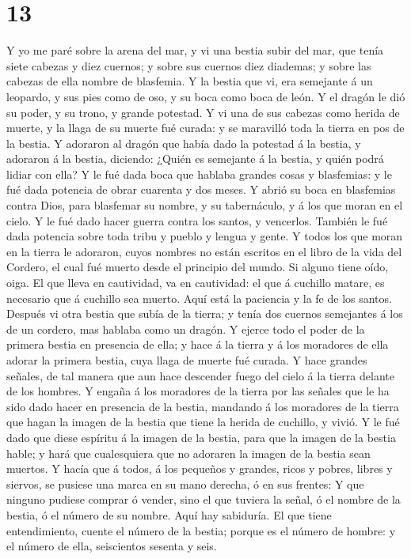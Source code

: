 \hypertarget{section-12}{%
\section{13}\label{section-12}}

 Y yo me paré sobre la arena del mar, y vi una bestia
subir del mar, que tenía siete cabezas y diez cuernos; y sobre sus
cuernos diez diademas; y sobre las cabezas de ella nombre de blasfemia.
 Y la bestia que vi, era semejante á un leopardo, y sus
pies como de oso, y su boca como boca de león. Y el dragón le dió su
poder, y su trono, y grande potestad.  Y vi una de sus
cabezas como herida de muerte, y la llaga de su muerte fué curada: y se
maravilló toda la tierra en pos de la bestia.  Y adoraron
al dragón que había dado la potestad á la bestia, y adoraron á la
bestia, diciendo: ¿Quién es semejante á la bestia, y quién podrá lidiar
con ella?  Y le fué dada boca que hablaba grandes cosas y
blasfemias: y le fué dada potencia de obrar cuarenta y dos meses.
 Y abrió su boca en blasfemias contra Dios, para blasfemar
su nombre, y su tabernáculo, y á los que moran en el cielo.
 Y le fué dado hacer guerra contra los santos, y
vencerlos. También le fué dada potencia sobre toda tribu y pueblo y
lengua y gente.  Y todos los que moran en la tierra le
adoraron, cuyos nombres no están escritos en el libro de la vida del
Cordero, el cual fué muerto desde el principio del mundo. 
Si alguno tiene oído, oiga.  El que lleva en cautividad,
va en cautividad: el que á cuchillo matare, es necesario que á cuchillo
sea muerto. Aquí está la paciencia y la fe de los santos.
 Después vi otra bestia que subía de la tierra; y tenía
dos cuernos semejantes á los de un cordero, mas hablaba como un dragón.
 Y ejerce todo el poder de la primera bestia en presencia
de ella; y hace á la tierra y á los moradores de ella adorar la primera
bestia, cuya llaga de muerte fué curada.  Y hace grandes
señales, de tal manera que aun hace descender fuego del cielo á la
tierra delante de los hombres.  Y engaña á los moradores
de la tierra por las señales que le ha sido dado hacer en presencia de
la bestia, mandando á los moradores de la tierra que hagan la imagen de
la bestia que tiene la herida de cuchillo, y vivió.  Y le
fué dado que diese espíritu á la imagen de la bestia, para que la imagen
de la bestia hable; y hará que cualesquiera que no adoraren la imagen de
la bestia sean muertos.  Y hacía que á todos, á los
pequeños y grandes, ricos y pobres, libres y siervos, se pusiese una
marca en su mano derecha, ó en sus frentes:  Y que
ninguno pudiese comprar ó vender, sino el que tuviera la señal, ó el
nombre de la bestia, ó el número de su nombre.  Aquí hay
sabiduría. El que tiene entendimiento, cuente el número de la bestia;
porque es el número de hombre: y el número de ella, seiscientos sesenta
y seis.

